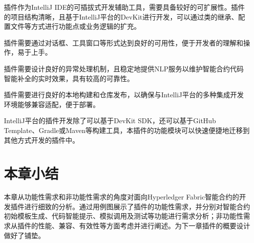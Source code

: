 插件作为IntelliJ IDE的可插拔式开发辅助工具，需要具备较好的可扩展性。插件的项目结构清晰，且基于IntelliJ平台的DevKit进行开发，可以通过类的继承、配置文件等方式进行功能点或业务逻辑的扩充。

插件需要通过对话框、工具窗口等形式达到良好的可用性，便于开发者的理解和操作，易于上手。

插件需要设计良好的异常处理机制，且稳定地提供NLP服务以维护智能合约代码智能补全的实时效果，具有较高的可靠性。

插件需要进行良好的本地构建和仓库发布，以确保与IntelliJ平台的多种集成开发环境能够兼容适配，便于部署。

IntelliJ平台的插件开发除了可以基于DevKit SDK，还可以基于GitHub Template、Gradle或Maven等构建工具，本插件的功能模块可以快速便捷地迁移到其他方式开发的插件中。

\section{本章小结}

本章从功能性需求和非功能性需求的角度对面向Hyperledger Fabric智能合约的开发插件进行细致的分析。通过用例图展示了插件的功能性需求，并分别对智能合约初始模板生成、代码智能提示、模拟调用及测试等功能进行需求分析；非功能性需求从插件的性能、兼容、有效性等方面考虑并进行阐述。为下一章插件的概要设计做好了铺垫。